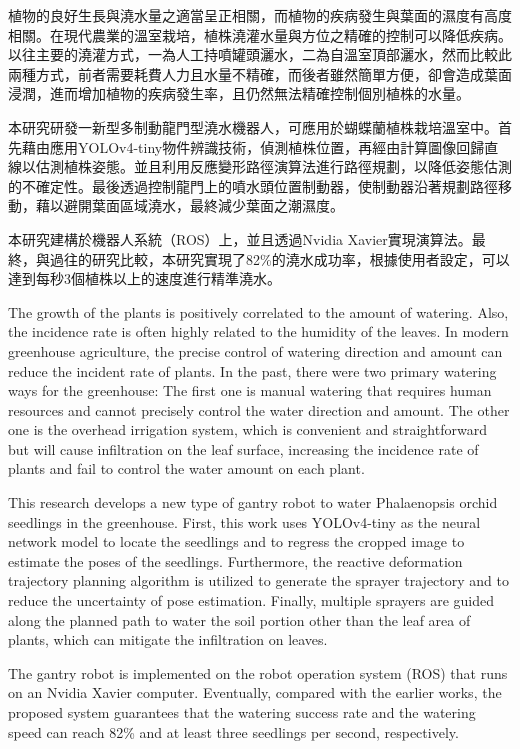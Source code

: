 \begin{abstractzh}
\setcounter{page}{1}
植物的良好生長與澆水量之適當呈正相關，而植物的疾病發生與葉面的濕度有高度相關。在現代農業的溫室栽培，植株澆灌水量與方位之精確的控制可以降低疾病。以往主要的澆灌方式，一為人工持噴罐頭灑水，二為自溫室頂部灑水，然而比較此兩種方式，前者需要耗費人力且水量不精確，而後者雖然簡單方便，卻會造成葉面浸潤，進而增加植物的疾病發生率，且仍然無法精確控制個別植株的水量。

本研究研發一新型多制動龍門型澆水機器人，可應用於蝴蝶蘭植株栽培溫室中。首先藉由應用YOLOv4-tiny物件辨識技術，偵測植株位置，再經由計算圖像回歸直線以估測植株姿態。並且利用反應變形路徑演算法進行路徑規劃，以降低姿態估測的不確定性。最後透過控制龍門上的噴水頭位置制動器，使制動器沿著規劃路徑移動，藉以避開葉面區域澆水，最終減少葉面之潮濕度。

本研究建構於機器人系統（ROS）上，並且透過Nvidia Xavier實現演算法。最終，與過往的研究比較，本研究實現了82\%的澆水成功率，根據使用者設定，可以達到每秒3個植株以上的速度進行精準澆水。

\end{abstractzh}


\begin{abstracten}
The growth of the plants is positively correlated to the amount of watering. Also, the incidence rate is often highly related to the humidity of the leaves. In modern greenhouse agriculture, the precise control of watering direction and amount can reduce the incident rate of plants. In the past, there were two primary watering ways for the greenhouse: The first one is manual watering that requires human resources and cannot precisely control the water direction and amount. The other one is the overhead irrigation system, which is convenient and straightforward but will cause infiltration on the leaf surface, increasing the incidence rate of plants and fail to control the water amount on each plant.

This research develops a new type of gantry robot to water Phalaenopsis orchid seedlings in the greenhouse. First, this work uses YOLOv4-tiny as the neural network model to locate the seedlings and to regress the cropped image to estimate the poses of the seedlings. Furthermore, the reactive deformation trajectory planning algorithm is utilized to generate the sprayer trajectory and to reduce the uncertainty of pose estimation. Finally, multiple sprayers are guided along the planned path to water the soil portion other than the leaf area of plants, which can mitigate the infiltration on leaves.

The gantry robot is implemented on the robot operation system (ROS) that runs on an Nvidia Xavier computer. Eventually, compared with the earlier works, the proposed system guarantees that the watering success rate and the watering speed can reach 82\% and at least three seedlings per second, respectively.
\end{abstracten}

